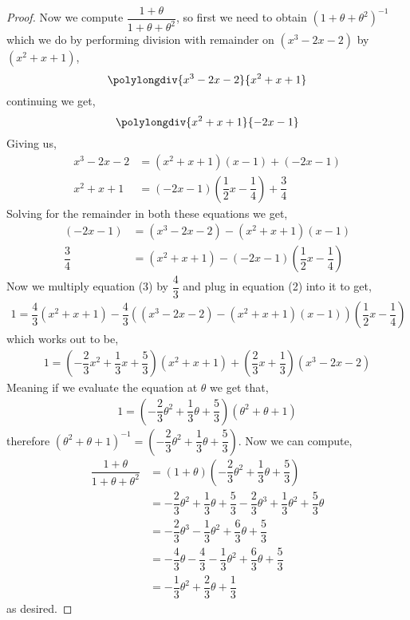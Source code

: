 \documentclass[11pt]{article}
\begin{document}
\begin{proof}
    Now we compute $\dfrac{1 + \theta}{1+ \theta + \theta^{2}}$, so first we need to obtain $(1 + \theta + \theta^{2})^{-1}$ which we do by performing division with remainder on $(x^{3} -2x -2)$ by $(x^{2} + x + 1)$,
    \[\polylongdiv{x^{3} -2x -2}{ x^{2} + x + 1}\]
    continuing we get,
    \[\polylongdiv{x^{2} + x + 1}{-2x-1}\]
    Giving us,
    \begin{align*}
        x^{3} -2x -2 &= (x^{2} + x + 1)(x-1) + (-2x - 1) \\
        x^{2} + x + 1 &= (-2x -1)(\dfrac{1}{2}x - \dfrac{1}{4}) + \dfrac{3}{4}
    \end{align*}
    Solving for the remainder in both these equations we get,
    \begin{align}
        (-2x - 1) & = (x^{3} -2x -2) - (x^{2} + x + 1)(x-1) \\
        \dfrac{3}{4} &= (x^{2} + x + 1) -(-2x -1)(\dfrac{1}{2}x - \dfrac{1}{4}) 
    \end{align}
    Now we multiply equation (3) by $\dfrac{4}{3}$ and plug in equation (2) into it to get,
    \begin{align*}
        1 = \dfrac{4}{3}(x^{2} + x + 1) - \dfrac{4}{3}((x^{3} -2x -2) - (x^{2} + x + 1)(x-1))(\dfrac{1}{2}x - \dfrac{1}{4}) 
    \end{align*}
    which works out to be,
    \begin{align*}
        1 = (-\dfrac{2}{3}x^{2} + \dfrac{1}{3}x + \dfrac{5}{3})(x^{2} + x + 1) + (\dfrac{2}{3}x + \dfrac{1}{3})(x^{3} - 2x -2)
    \end{align*}
    Meaning if we evaluate the equation at $\theta$ we get that,
    \begin{align*}
        1 = (-\dfrac{2}{3}\theta^{2} + \dfrac{1}{3}\theta + \dfrac{5}{3})(\theta^{2} + \theta + 1)
    \end{align*}
    therefore $(\theta^{2} + \theta + 1)^{-1} = (-\dfrac{2}{3}\theta^{2} + \dfrac{1}{3}\theta + \dfrac{5}{3})$. Now we can compute,
    \begin{align*}
        \dfrac{1 + \theta}{1 + \theta + \theta^{2}} &= (1+\theta)(-\dfrac{2}{3}\theta^{2} + \dfrac{1}{3}\theta + \dfrac{5}{3}) \\
        &= -\dfrac{2}{3}\theta^{2} + \dfrac{1}{3}\theta + \dfrac{5}{3} -\dfrac{2}{3}\theta^{3} + \dfrac{1}{3}\theta^{2} + \dfrac{5}{3}\theta \\
        &= -\dfrac{2}{3}\theta^{3} - \dfrac{1}{3}\theta^{2} + \dfrac{6}{3}\theta + \dfrac{5}{3} \\
        &= -\dfrac{4}{3}\theta - \dfrac{4}{3} - \dfrac{1}{3}\theta^{2}+ \dfrac{6}{3}\theta + \dfrac{5}{3} \\
        &= -\dfrac{1}{3}\theta^{2} + \dfrac{2}{3}\theta + \dfrac{1}{3}
    \end{align*}
    as desired.

\end{proof}
\end{document}
